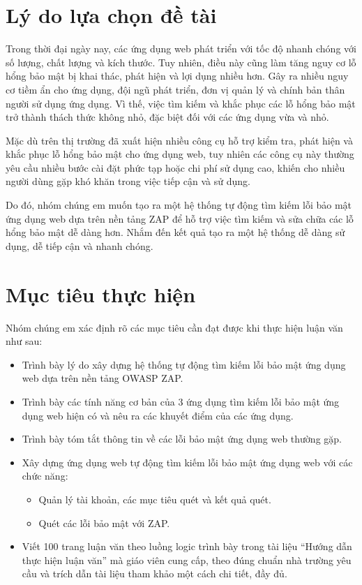 \section{Lý do lựa chọn đề tài}

\tab Trong thời đại ngày nay, các ứng dụng web phát triển với tốc độ nhanh chóng với số lượng, chất lượng và kích thước.
Tuy nhiên, điều này cũng làm tăng nguy cơ lỗ hổng bảo mật bị khai thác, phát hiện và lợi dụng nhiều hơn.
Gây ra nhiều nguy cơ tiềm ẩn cho ứng dụng, đội ngũ phát triển, đơn vị quản lý và chính bản thân người sử dụng ứng dụng.
Vì thế, việc tìm kiếm và khắc phục các lỗ hổng bảo mật trở thành thách thức không nhỏ, đặc biệt đối với các ứng dụng vừa và nhỏ.
\par

Mặc dù trên thị trường đã xuất hiện nhiều công cụ hỗ trợ kiểm tra, phát hiện và khắc phục lỗ hổng bảo mật cho ứng
dụng web, tuy nhiên các công cụ này thường yêu cầu nhiều bước cài đặt phức tạp hoặc chi phí sử dụng cao, khiến cho nhiều người dùng gặp khó khăn trong việc tiếp cận và sử dụng.
\par

Do đó, nhóm chúng em muốn tạo ra một hệ thống tự động tìm kiếm lỗi bảo mật ứng dụng web dựa trên nền tảng ZAP để hỗ trợ việc tìm kiếm và sửa chữa các lỗ hổng bảo mật dễ dàng hơn.
Nhắm đến kết quả tạo ra một hệ thống dễ dàng sử dụng, dễ tiếp cận và nhanh chóng.

\newpage
\section{Mục tiêu thực hiện}

Nhóm chúng em xác định rõ các mục tiêu cần đạt được khi thực hiện luận văn như sau:

\begin{itemize}
    \item Trình bày lý do xây dựng hệ thống tự động tìm kiếm lỗi bảo mật ứng dụng web dựa trên nền tảng OWASP ZAP.
    \item Trình bày các tính năng cơ bản của 3 ứng dụng tìm kiếm lỗi bảo mật ứng dụng web hiện có và nêu ra các khuyết điểm của các ứng dụng.
    \item Trình bày tóm tắt thông tin về các lỗi bảo mật ứng dụng web thường gặp.
    \item Xây dựng ứng dụng web tự động tìm kiếm lỗi bảo mật ứng dụng web với các chức năng:
          \begin{itemize}
              \item Quản lý tài khoản, các mục tiêu quét và kết quả quét.
              \item Quét các lỗi bảo mật với ZAP.
          \end{itemize}
    \item Viết 100 trang luận văn theo luồng logic trình bày trong tài liệu “Hướng dẫn thực hiện luận văn” mà giáo viên cung cấp, theo đúng chuẩn nhà trường yêu cầu và trích dẫn tài liệu tham khảo một cách chi tiết, đầy đủ.
\end{itemize}

